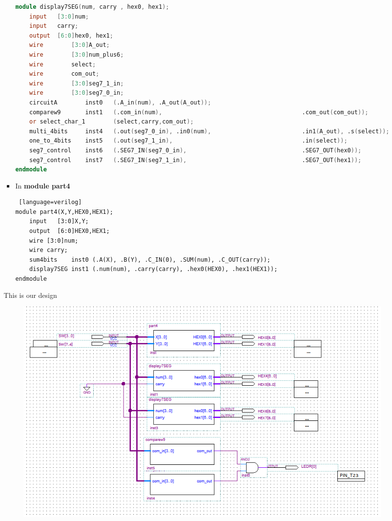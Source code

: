 \begin{itemize}
\begin{itemize}
\begin{itemize}
\begin{lstlisting}[language=verilog]
module display7SEG(num, carry , hex0, hex1);
	input 	[3:0]num;
	input 	carry;
	output	[6:0]hex0, hex1;
	wire		[3:0]A_out;
	wire 		[3:0]num_plus6;
	wire		select;
	wire		com_out;
	wire		[3:0]seg7_1_in;
	wire		[3:0]seg7_0_in;
	circuitA 		inst0	(.A_in(num), .A_out(A_out));
	comparew9 		inst1	(.com_in(num),                                        .com_out(com_out));
	or select_char_1 		(select,carry,com_out);
	multi_4bits 	inst4	(.out(seg7_0_in), .in0(num),                          .in1(A_out), .s(select));
	one_to_4bits 	inst5	(.out(seg7_1_in),                                     .in(select));
	seg7_control 	inst6	(.SEG7_IN(seg7_0_in),                                 .SEG7_OUT(hex0));
	seg7_control 	inst7	(.SEG7_IN(seg7_1_in),                                 .SEG7_OUT(hex1));
endmodule
                        \end{lstlisting}
                    \item [] In \textbf{module part4}
                        \begin{lstlisting} [language=verilog]
module part4(X,Y,HEX0,HEX1);
	input 	[3:0]X,Y;
	output	[6:0]HEX0,HEX1;
	wire [3:0]num;
	wire carry;
	sum4bits 	inst0 (.A(X), .B(Y), .C_IN(0), .SUM(num), .C_OUT(carry));
	display7SEG	inst1 (.num(num), .carry(carry), .hex0(HEX0), .hex1(HEX1));
endmodule
                        \end{lstlisting}
                \end{itemize} This is our design
                    \begin{figure}[h]
                        \centering
                        \includegraphics[width=\textwidth]{source/picture/Lab2/Lab2_4.png}
                    \end{figure}
        \end{itemize}
    
\end{itemize}
\clearpage